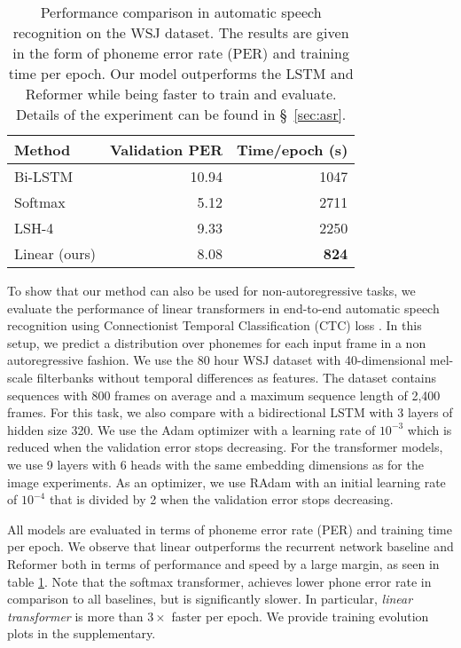 \documentclass{article}
\newcommand{\linear}{\emph{linear transformer}}
\begin{document}
\bgroup
\renewcommand{\arraystretch}{1.1}
\begin{table}
    \begin{center}
    \begin{tabular}{lrr}
        Method & Validation PER & Time/epoch (s) \\
        \hline
        Bi-LSTM & 10.94 & 1047 \\
        \hline
        Softmax &  5.12 & 2711 \\
               LSH-4   &  9.33 & 2250 \\
        \hline
        Linear (ours) & 8.08 & \textbf{824}
    \end{tabular}
    \end{center}
    \caption{Performance comparison in automatic speech recognition on the WSJ
             dataset. The results are given in the form of phoneme error rate
             (PER) and training time per epoch. Our model outperforms the LSTM
             and Reformer while being faster to train and evaluate. Details of
             the experiment can be found in \S~\ref{sec:asr}.}
    \label{tab:asr}
    \vspace{-1em}
\end{table}
\egroup

To show that our method can also be used for non-autoregressive tasks, we
evaluate the performance of linear transformers in end-to-end automatic speech
recognition using Connectionist Temporal Classification (CTC) loss
\cite{graves2006connectionist}. In this setup, we predict a distribution over
phonemes for each input frame in a non autoregressive fashion. We use the 80
hour WSJ dataset \cite{paul1992design} with 40-dimensional mel-scale
filterbanks without temporal differences as features. The dataset contains
sequences with 800 frames on average and a maximum sequence length of 2,400
frames.
For this task, we also compare with a bidirectional LSTM
\cite{hochreiter1997long} with 3 layers of hidden size 320. We use the Adam
optimizer \cite{kingma2014adam} with a learning rate of $10^{-3}$ which is
reduced when the validation error stops decreasing. For the transformer models,
we use 9 layers with 6 heads with the same embedding dimensions as for the
image experiments. As an optimizer, we use RAdam with an initial learning rate
of $10^{-4}$ that is divided by 2 when the validation error stops decreasing.

All models are evaluated in terms of phoneme error rate (PER) and training time per
epoch. We observe that linear outperforms the recurrent network baseline and
Reformer both in terms of performance and speed by a large margin, as seen in
table \ref{tab:asr}. Note that the softmax transformer, achieves lower phone
error rate in comparison to all baselines, but is significantly slower. In
particular, \linear{} is more than $3 \times$ faster per epoch. We provide
training evolution plots in the supplementary.
\end{document}
